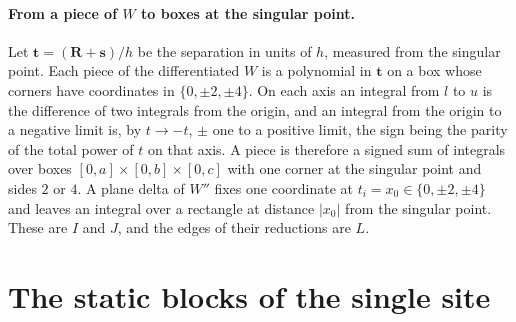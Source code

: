 \documentclass[11pt,a4paper]{article}
\begin{document}
\paragraph{From a piece of $W$ to boxes at the singular point.} Let $\mathbf{t}=(\mathbf{R}+\mathbf{s})/h$
be the separation in units of $h$, measured from the singular point. Each piece of the differentiated
$W$ is a polynomial in $\mathbf{t}$ on a box whose corners have coordinates in $\{0,\pm2,\pm4\}$. On each
axis an integral from $l$ to $u$ is the difference of two integrals from the origin, and an integral from
the origin to a negative limit is, by $t\to-t$, $\pm$ one to a positive limit, the sign being the parity
of the total power of $t$ on that axis. A piece is therefore a signed sum of integrals over boxes
$[0,a]\times[0,b]\times[0,c]$ with one corner at the singular point and sides $2$ or $4$. A plane delta
of $W''$ fixes one coordinate at $t_i=x_0\in\{0,\pm2,\pm4\}$ and leaves an integral over a rectangle at
distance $|x_0|$ from the singular point. These are $I$ and $J$, and the edges of their reductions are $L$.

\section{The static blocks of the single site}\label{app:blocks}
\end{document}
